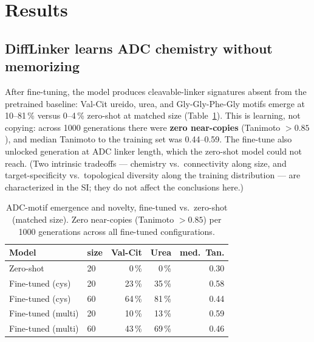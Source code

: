 \documentclass[10pt,twocolumn]{article}
\begin{document}
\section{Results}

\subsection{DiffLinker learns ADC chemistry without memorizing}
After fine-tuning, the model produces cleavable-linker signatures absent from the pretrained baseline:
Val-Cit ureido, urea, and Gly-Gly-Phe-Gly motifs emerge at 10--81\,\% versus 0--4\,\% zero-shot at
matched size (Table~\ref{tab:motifs}). This is learning, not copying: across 1000 generations there were
\textbf{zero near-copies} (Tanimoto $>0.85$), and median Tanimoto to the training set was 0.44--0.59. The
fine-tune also unlocked generation at ADC linker length, which the zero-shot model could not reach. (Two
intrinsic tradeoffs --- chemistry vs.\ connectivity along size, and target-specificity vs.\ topological
diversity along the training distribution --- are characterized in the SI; they do not affect the
conclusions here.)

\begin{table}[t]
\caption{ADC-motif emergence and novelty, fine-tuned vs.\ zero-shot (matched size). Zero near-copies
(Tanimoto $>0.85$) per 1000 generations across all fine-tuned configurations.}
\label{tab:motifs}
\centering\small
\setlength{\tabcolsep}{5pt}
\begin{tabular}{@{}llrrr@{}}
\toprule
\rowcolor{tint}\sffamily Model & \sffamily size & \sffamily Val-Cit & \sffamily Urea & \sffamily med.\ Tan. \\
\midrule
Zero-shot          & 20 & 0\,\%  & 0\,\%  & 0.30 \\
Fine-tuned (cys)   & 20 & 23\,\% & 35\,\% & 0.58 \\
Fine-tuned (cys)   & 60 & 64\,\% & 81\,\% & 0.44 \\
Fine-tuned (multi) & 20 & 10\,\% & 13\,\% & 0.59 \\
Fine-tuned (multi) & 60 & 43\,\% & 69\,\% & 0.46 \\
\bottomrule
\end{tabular}
\end{table}
\end{document}
